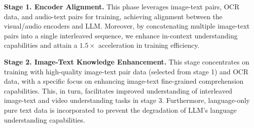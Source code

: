 \textbf{Stage 1. Encoder Alignment.}
This phase leverages image-text pairs, OCR data, and audio-text pairs for training, achieving alignment between the visual/audio encoders and \method LLM. Moreover, by concatenating multiple image-text pairs into a single interleaved sequence, we enhance in-context understanding capabilities and attain a $1.5\times$ acceleration in training efficiency.

\textbf{Stage 2. Image-Text Knowledge Enhancement.}
This stage concentrates on training with high-quality image-text pair data (selected from stage 1) and OCR data, with a specific focus on enhancing image-text fine-grained comprehension capabilities. This, in turn, facilitates improved understanding of interleaved image-text and video understanding tasks in stage 3. Furthermore, language-only pure text data is incorporated to prevent the degradation of \method LLM's language understanding capabilities.





